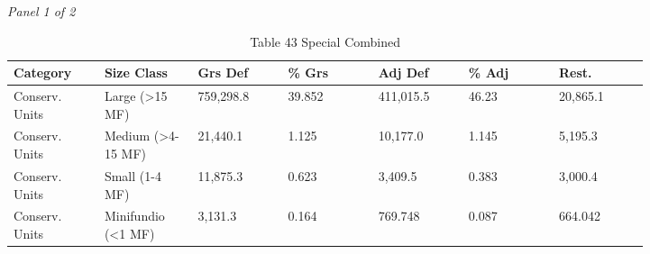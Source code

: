 \documentclass[12pt]{article}
\begin{document}
\begin{landscape}
\begin{table}[H]
\centering
\caption{Table 43 Special Combined}
\textit{Panel 1 of 2}\\[2pt]
{\fontsize{12}{14}\selectfont
\setlength{\tabcolsep}{3pt}
\renewcommand{\arraystretch}{1.08}
\begin{tabular}{p{0.117\linewidth}p{0.117\linewidth}p{0.117\linewidth}p{0.117\linewidth}p{0.117\linewidth}p{0.117\linewidth}p{0.117\linewidth}}
\toprule
Category & Size Class & Grs Def & \% Grs & Adj Def & \% Adj & Rest. \\
\midrule
Conserv. Units & Large (>15 MF) & 759,298.8 & 39.852 & 411,015.5 & 46.23 & 20,865.1 \\
Conserv. Units & Medium (>4-15 MF) & 21,440.1 & 1.125 & 10,177.0 & 1.145 & 5,195.3 \\
Conserv. Units & Small (1-4 MF) & 11,875.3 & 0.623 & 3,409.5 & 0.383 & 3,000.4 \\
Conserv. Units & Minifundio (<1 MF) & 3,131.3 & 0.164 & 769.748 & 0.087 & 664.042 \\
\bottomrule
\end{tabular}
}

\vspace{0.6em}


\end{table}
\end{landscape}
\end{document}
